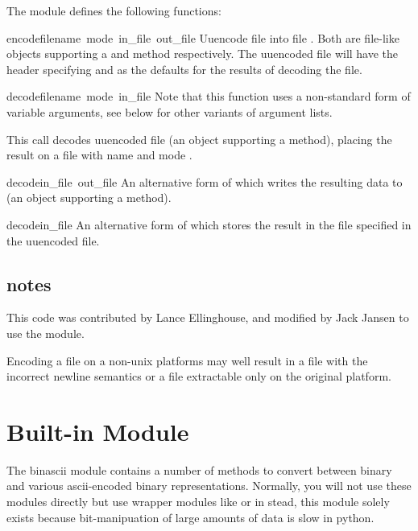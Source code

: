 The  module defines the following functions:

\renewcommand{\indexsubitem}{(in module uu)}

\begin{funcdesc}{encode}{filename\, mode\, in_file\, out_file}
Uuencode file  into file . Both are
file-like objects supporting a  and  method
respectively. The uuencoded file will have the header specifying
 and  as the defaults for the results of
decoding the file.
\end{funcdesc}

\begin{funcdesc}{decode}{filename\, mode\, in_file}
Note that this function uses a non-standard form of variable
arguments, see below for other variants of argument lists.

This call decodes uuencoded file  (an object supporting a
 method), placing the result on a file with name
 and mode .
\end{funcdesc}

\begin{funcdesc}{decode}{in_file\, out_file}
An alternative form of  which writes the resulting data to
 (an object supporting a  method).
\end{funcdesc}

\begin{funcdesc}{decode}{in_file}
An alternative form of  which stores the result in the
file specified in the uuencoded file.
\end{funcdesc}

\subsection{notes}
This code was contributed by Lance Ellinghouse, and modified by Jack
Jansen to use the  module.

Encoding a file on a non-unix platforms may well result in a file
with the incorrect newline semantics or a file extractable only on the
original platform.
\section{Built-in Module }	%

The binascii module contains a number of methods to convert between
binary and various ascii-encoded binary representations. Normally, you
will not use these modules directly but use wrapper modules like
 or  in stead, this module solely exists because
bit-manipuation of large amounts of data is slow in python.

